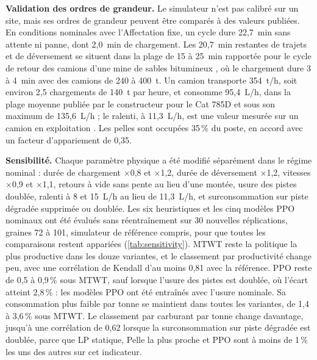 \documentclass[11pt,a4paper]{article}
\newif\ifcorrmarks
\newcommand{\corr}[1]{\ifcorrmarks\textcolor{corrcolor}{#1}\else#1\fi}
\newenvironment{corrbloc}{\par\ifcorrmarks\color{corrcolor}\fi}{\par}
\begin{document}
\begin{corrbloc}
\textbf{Validation des ordres de grandeur.} Le simulateur n'est pas calibré sur un site, mais ses ordres de grandeur peuvent être comparés à des valeurs publiées. En conditions nominales avec l'Affectation fixe, un cycle dure 22,7~min sans attente ni panne, dont 2,0~min de chargement. Les 20,7~min restantes de trajets et de déversement se situent dans la plage de 15 à 25~min rapportée pour le cycle de retour des camions d'une mine de sables bitumineux \cite{ChungTa2013}, où le chargement dure 3 à 4~min avec des camions de 240 à 400~t. Un camion transporte 354~t/h, soit environ 2,5 chargements de 140~t par heure, et consomme 95,4~L/h, dans la plage moyenne publiée par le constructeur pour le Cat 785D et sous son maximum de 135,6~L/h \cite{Caterpillar2019} ; le ralenti, à 11,3~L/h, est une valeur mesurée sur un camion en exploitation \cite{Kubler2015}. Les pelles sont occupées 35\,\% du poste, en accord avec un facteur d'appariement de 0,35.

\textbf{Sensibilité.} Chaque paramètre physique a été modifié séparément dans le régime nominal : durée de chargement $\times$0,8 et $\times$1,2, durée de déversement $\times$1,2, vitesses $\times$0,9 et $\times$1,1, retours à vide sans pente au lieu d'une montée, usure des pistes doublée, ralenti à 8 et 15~L/h au lieu de 11,3~L/h, et surconsommation sur piste dégradée supprimée ou doublée. Les six heuristiques et les cinq modèles PPO nominaux ont été évalués sans réentraînement sur 30 nouvelles réplications, graines 72 à 101, simulateur de référence compris, pour que toutes les comparaisons restent appariées (\cref{tab:sensitivity}). MTWT reste la politique la plus productive dans les douze variantes, et le classement par productivité change peu, avec une corrélation de Kendall d'au moins 0,81 avec la référence. PPO reste de 0,5 à 0,9\,\% sous MTWT, sauf lorsque l'usure des pistes est doublée, où l'écart atteint 2,8\,\% : les modèles PPO ont été entraînés avec l'usure nominale. Sa consommation plus faible par tonne se maintient dans toutes les variantes, de 1,4 à 3,6\,\% sous MTWT. Le classement par carburant par tonne change davantage, jusqu'à une corrélation de 0,62 lorsque la surconsommation sur piste dégradée est doublée, parce que \corr{LP statique}, Pelle la plus proche et PPO sont à moins de 1\,\% les uns des autres sur cet indicateur.


\end{corrbloc}
\end{document}

